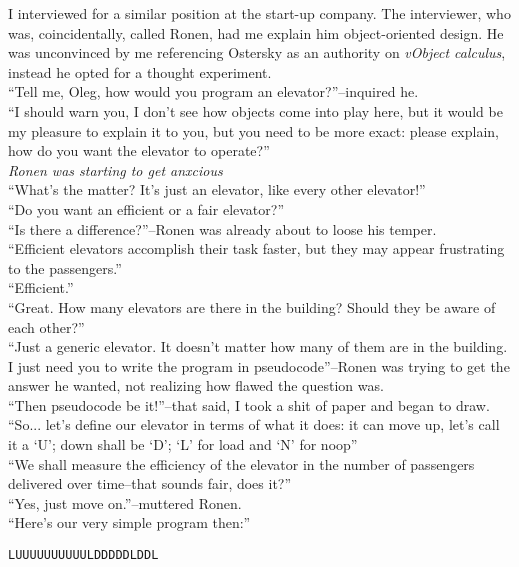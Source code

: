 \documentclass[11pt,a4paper,oneside]{memoir}
\begin{document}
\begin{description}[itemsep=1ex,leftmargin=1cm]
\item[Oleg] I interviewed for a similar position at the start-up
  company. The interviewer, who was, coincidentally, called Ronen,
  had me explain him object-oriented design. He was unconvinced by
  me referencing Ostersky as an authority on \textit{vObject calculus},
  instead he opted for a thought experiment.\\
  ``Tell me, Oleg, how would you program an elevator?''--inquired he.\\
  ``I should warn you, I don't see how objects come into play here,
  but it would be my pleasure to explain it to you, but you need to
  be more exact: please explain, how do you want the elevator to operate?''\\
  \textit{Ronen was starting to get anxcious}\\
  ``What's the matter? It's just an elevator, like every other elevator!''\\
  ``Do you want an efficient or a fair elevator?''\\
  ``Is there a difference?''--Ronen was already about to loose his temper.\\
  ``Efficient elevators accomplish their task faster, but they may appear
  frustrating to the passengers.''\\
  ``Efficient.''\\
  ``Great. How many elevators are there in the building? Should they be
  aware of each other?''\\
  ``Just a generic elevator. It doesn't matter how many of them are in
  the building. I just need you to write the program in pseudocode''--Ronen
  was trying to get the answer he wanted, not realizing how flawed the
  question was.\\
  ``Then pseudocode be it!''--that said, I took a shit of paper and began
  to draw.\\
  ``So... let's define our elevator in terms of what it does: it can
  move up, let's call it a `U'; down shall be `D'; `L' for load and
  `N' for noop''\\
  ``We shall measure the efficiency of the elevator in the number of passengers
  delivered over time--that sounds fair, does it?''\\
  ``Yes, just move on.''--muttered Ronen.\\
  ``Here's our very simple program then:''\\
\begin{verbatim}
LUUUUUUUUUULDDDDDLDDL
\end{verbatim}

\end{description}
\end{document}
